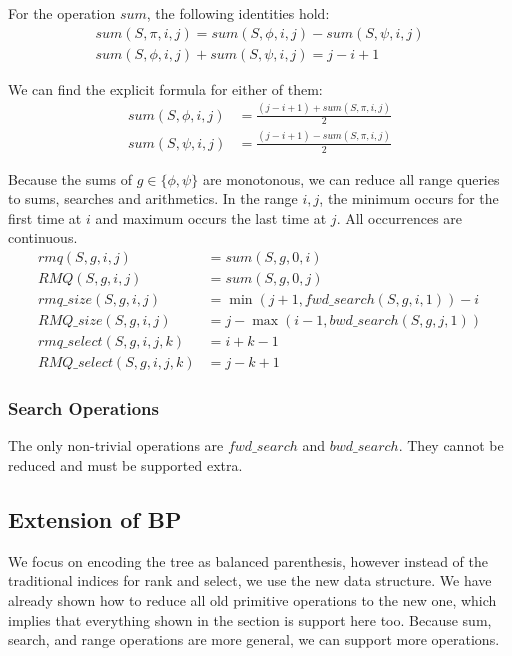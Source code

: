 For the operation $sum$, the following identities hold:
\begin{gather*}
	sum(S, \pi, i, j) = sum(S, \phi, i, j) - sum(S, \psi, i, j) \\
	sum(S, \phi, i, j) + sum(S, \psi, i, j) = j - i + 1
\end{gather*}

We can find the explicit formula for either of them:
\begin{align*}
	sum(S, \phi, i, j) &= \frac{(j - i + 1) + sum(S, \pi, i, j)}{2} \\
	sum(S, \psi, i, j) &= \frac{(j - i + 1) - sum(S, \pi, i, j)}{2}
\end{align*}

Because the sums of $g \in \{\phi, \psi \}$ are monotonous, we can reduce all range queries to sums, searches and arithmetics.
In the range $i, j$, the minimum occurs for the first time at $i$ and maximum occurs the last time at $j$.
All occurrences are continuous.
\begin{align*}
	rmq(S, g, i, j) &= sum(S, g, 0, i) \\
	RMQ(S, g, i, j) &= sum(S, g, 0, j) \\
	rmq\_size(S, g, i, j) &= \min(j + 1, fwd\_search(S, g, i, 1)) - i \\
	RMQ\_size(S, g, i, j) &= j - \max(i - 1, bwd\_search(S, g, j, 1)) \\
	rmq\_select(S, g, i, j, k) &= i + k - 1 \\ 
	RMQ\_select(S, g, i, j, k) &= j - k + 1
\end{align*}

\subsubsection{Search Operations}

The only non-trivial operations are $fwd\_search$ and $bwd\_search$.
They cannot be reduced and must be supported extra.


\subsection{Extension of BP}

We focus on encoding the tree as balanced parenthesis, however instead of the traditional indices for rank and select, we use the new data structure.
We have already shown how to reduce all old primitive operations to the new one, which implies that everything shown in the section  is support here too.
Because sum, search, and range operations are more general, we can support more operations.

